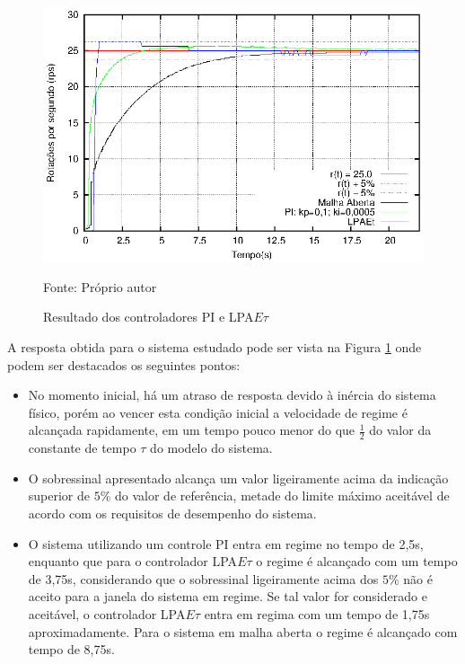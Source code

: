 \begin{figure}[!htb]
\centering
\caption{Resultado dos controladores PI e LPA$E\tau$}
\center\includegraphics[scale=1.6]{./plot/resAcaoPI.eps}
\label{fig:resultadoAcaoPILPAEt}

{\small Fonte: Próprio autor}
\end{figure}









A resposta obtida para o sistema estudado pode ser vista na Figura \ref{fig:resultadoAcaoPILPAEt} onde podem ser destacados os seguintes pontos:

\begin{itemize}
\item No momento inicial, há um atraso de resposta devido à inércia do
  sistema físico, porém ao vencer esta condição inicial a velocidade
  de regime é alcançada rapidamente, em um tempo pouco menor do que $\frac{1}{2}$ do valor da constante de tempo $\tau$ do modelo do sistema.

\item O sobressinal apresentado alcança um valor ligeiramente acima da
  indicação superior de $5\%$ do valor de referência, metade do limite máximo aceitável de acordo com os requisitos de desempenho do sistema.

\item O sistema utilizando um controle PI entra em regime no tempo de
  2,5s, enquanto que para o controlador LPA$E\tau$ o regime é
  alcançado com um tempo de 3,75s, considerando que o sobressinal
  ligeiramente acima dos $5\%$ não é aceito para a janela do sistema
  em regime. Se tal valor for considerado e aceitável, o controlador
  LPA$E\tau$ entra em regima com um tempo de 1,75s aproximadamente.
Para o sistema em malha aberta o regime é alcançado com tempo de 8,75s. 

\end{itemize}


